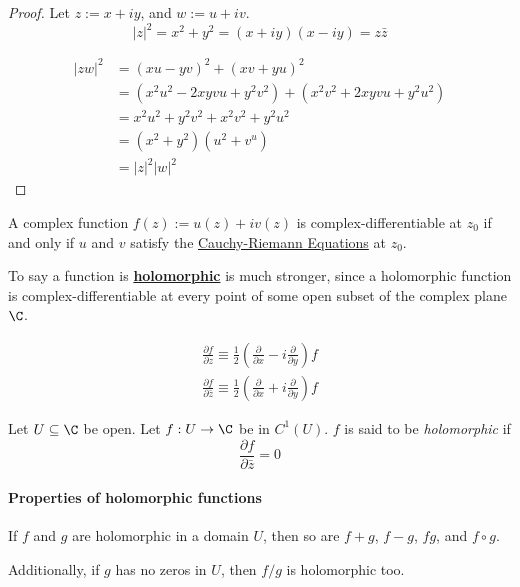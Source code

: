 \begin{proof}
  Let $z:=x+iy$, and $w:=u+iv$.
  $$
    |z|^2=x^2+y^2=(x+iy)(x-iy)=z\bar z
  $$

  \begin{align*}
    |zw|^2
     &= (xu-yv)^2+(xv+yu)^2                        \\
     &=(x^2u^2-2xyvu+y^2v^2)+(x^2v^2+2xyvu+y^2u^2) \\
     &=x^2u^2+y^2v^2+x^2v^2+y^2u^2                 \\
     &=(x^2+y^2)(u^2+v^u)                          \\
     &=|z|^2|w|^2
  \end{align*}
\end{proof}

\label{d1d5d93}

A complex function $f(z):=u(z)+iv(z)$ is complex-differentiable at $z_0$ if and
only if $u$ and $v$ satisfy the \href{fb10fd3}{Cauchy-Riemann Equations} at
$z_0$.

To say a function is \href{e1e08f7}{\textbf{holomorphic}} is much stronger,
since a holomorphic function is complex-differentiable at every point of some
open subset of the complex plane $\C$.

\label{ffea0ed}

\begin{gather*}
  \frac{\partial f}{\partial z}\equiv\frac12\left(\frac{\partial}{\partial x}-i\frac{\partial}{\partial y}\right)f \\[1em]
  \frac{\partial f}{\partial\bar z}\equiv\frac12\left(\frac{\partial}{\partial x}+i\frac{\partial}{\partial y}\right)f
\end{gather*}

\label{e1e08f7}

Let $U\subseteq\C$ be open. Let $f:U\to\C$ be in $C^1(U)$. $f$ is said to be
\textit{holomorphic} if
$$
  \frac{\partial f}{\partial\bar z}=0
$$

\paragraph{Properties of holomorphic functions}

If $f$ and $g$ are holomorphic in a domain $U$, then so are $f+g$, $f-g$, $fg$,
and $f\circ g$.

Additionally, if $g$ has no zeros in $U$, then $f/g$ is holomorphic too.

